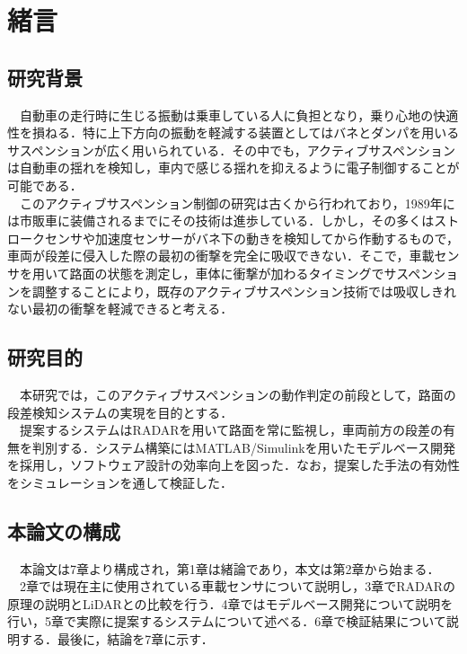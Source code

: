 \chapter{緒言}
\section{研究背景}
　自動車の走行時に生じる振動は乗車している人に負担となり，乗り心地の快適性を損ねる．特に上下方向の振動を軽減する装置としてはバネとダンパを用いるサスペンションが広く用いられている．その中でも，アクティブサスペンションは自動車の揺れを検知し，車内で感じる揺れを抑えるように電子制御することが可能である．\\
　このアクティブサスペンション制御の研究は古くから行われており，1989年には市販車に装備されるまでにその技術は進歩している\cite{active_suspension}．しかし，その多くはストロークセンサや加速度センサーがバネ下の動きを検知してから作動するもので，車両が段差に侵入した際の最初の衝撃を完全に吸収できない．そこで，車載センサを用いて路面の状態を測定し，車体に衝撃が加わるタイミングでサスペンションを調整することにより，既存のアクティブサスペンション技術では吸収しきれない最初の衝撃を軽減できると考える．\\

\section{研究目的}
　本研究では，このアクティブサスペンションの動作判定の前段として，路面の段差検知システムの実現を目的とする．\\
　提案するシステムはRADARを用いて路面を常に監視し，車両前方の段差の有無を判別する．システム構築にはMATLAB/Simulinkを用いたモデルベース開発を採用し，ソフトウェア設計の効率向上を図った．なお，提案した手法の有効性をシミュレーションを通して検証した．\\

\section{本論文の構成}
　本論文は7章より構成され，第1章は緒論であり，本文は第2章から始まる．\\
　2章では現在主に使用されている車載センサについて説明し，3章でRADARの原理の説明とLiDARとの比較を行う．4章ではモデルベース開発について説明を行い，5章で実際に提案するシステムについて述べる．6章で検証結果について説明する．最後に，結論を7章に示す．\\
